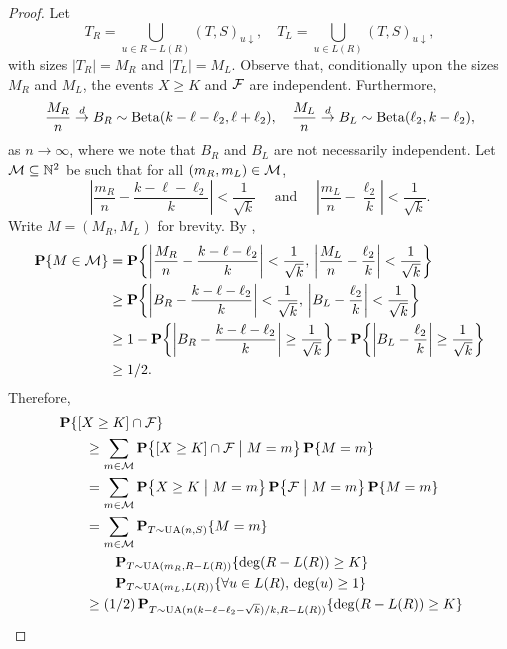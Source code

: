 \begin{proof}
  Let
  \[
    T_R = \bigcup_{u \in R - L(R)} (T, S)_{u \downarrow}, \quad T_L = \bigcup_{u \in L(R)} (T, S)_{u \downarrow} ,
  \]
  with sizes $|T_R| = M_R$ and $|T_L| = M_L$.  Observe that,
  conditionally upon the sizes $M_R$ and $M_L$, the events $X \ge K$
  and $\mathcal{F}$ are independent. Furthermore,
  \[
    \frac{M_R}{n} \overset{d}{\to} B_R \sim \operatorname{Beta}(k - \ell - \ell_2, \ell + \ell_2), \quad \frac{M_L}{n} \overset{d}{\to} B_L \sim \operatorname{Beta}(\ell_2, k - \ell_2) ,
  \]
  as $n \to \infty$, where we note that $B_R$ and $B_L$ are not
  necessarily independent. Let $\mathcal{M} \subseteq \mathbb{N}^2$ be such that for
  all $(m_R, m_L) \in \mathcal{M}$,
  \[    
    \left|\frac{m_R}{n} - \frac{k - \ell - \ell_2}{k}\right| <
    \frac{1}{\sqrt{k}} \quad \text{ and } \quad \left|\frac{m_L}{n} - \frac{\ell_2}{k}\right| <
    \frac{1}{\sqrt{k}} .
  \]
  Write $M = (M_R, M_L)$ for brevity. By ,
  \begin{align*}
    \Pr\{M \in \sM\} &= \Pr\left\{\left|\frac{M_R}{n} - \frac{k - \ell - \ell_2}{k}\right| < \frac{1}{\sqrt{k}} , \,  \left|\frac{M_L}{n} - \frac{\ell_2}{k}\right| < \frac{1}{\sqrt{k}}\right\} \\
    &\ge \Pr\left\{\left| B_R - \frac{k - \ell - \ell_2}{k}\right| < \frac{1}{\sqrt{k}} , \, \left|B_L - \frac{\ell_2}{k}\right| < \frac{1}{\sqrt{k}}\right\} \\
    &\ge 1 - \Pr\left\{\left|B_R - \frac{k - \ell - \ell_2}{k}\right| \ge \frac{1}{\sqrt{k}}\right\} - \Pr\left\{\left|B_L - \frac{\ell_2}{k}\right| \ge \frac{1}{\sqrt{k}}\right\} \\
    &\ge 1/2 .
  \end{align*}
  Therefore,
  \begin{align*}
    &\Pr\{[X \ge K] \cap \sF\} \\
    &\qquad \ge \sum_{m \in \sM} \Pr\bigl\{[X \ge K] \cap \sF \mathrel{\bigm|} M = m\bigr\} \Pr\{M = m\} \\
    &\qquad = \sum_{m \in \sM} \Pr\bigl\{X \ge K \mathrel{\bigm|} M = m\bigr\} \Pr\bigl\{\sF \mathrel{\bigm|} M = m\bigr\} \Pr\{M = m\} \\
    &\qquad = \sum_{m \in \sM} \Pr_{T \sim \UA(n, S)}\{M = m\} \\
    &\qquad \qquad \Pr_{T \sim \UA(m_R, R - L(R))}\{\deg(R - L(R)) \ge K\} \\
    &\qquad \qquad \Pr_{T \sim \UA(m_L, L(R))}\{\forall u \in L(R), \, \deg(u) \ge 1\} \\
    &\qquad \ge (1/2) \Pr_{T \sim \UA(n(k - \ell - \ell_2 - \sqrt{k})/k, R - L(R))}\{\deg(R - L(R)) \ge K\} \\

\end{align*}
\end{proof}
